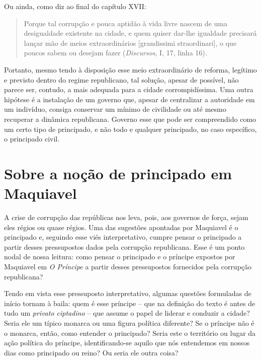 Ou ainda, como diz ao final do capítulo XVII:

\begin{quote}
Porque tal corrupção e pouca aptidão à vida livre nascem de uma
desigualdade existente na cidade, e quem quiser dar-lhe igualdade
precisará lançar mão de meios extraordinários {[}grandissimi
straordinari{]}, o que poucos sabem ou desejam fazer (\emph{Discursos},
I, 17, linha 16)\emph{.}
\end{quote}

Portanto, mesmo tendo à disposição esse meio extraordinário de reforma,
legítimo e previsto dentro do regime republicano, tal solução, apesar de
possível, não parece ser, contudo, a mais adequada para a cidade
corrompidíssima. Uma outra hipótese é a instalação de um governo que,
apesar de centralizar a autoridade em um indivíduo, consiga conservar um
mínimo de civilidade ou até mesmo recuperar a dinâmica republicana.
Governo esse que pode ser compreendido como um certo tipo de principado,
e não todo e qualquer principado, no caso específico, o principado
civil.

\section{Sobre a noção de principado em Maquiavel}

A crise de corrupção das repúblicas nos leva, pois, aos governos de
força, sejam eles régios ou quase régios. Uma das sugestões apontadas
por Maquiavel é o principado e, seguindo esse viés interpretativo,
cumpre pensar o principado a partir desses pressupostos dados pela
corrupção republicana. Esse é um ponto nodal de nossa leitura: como
pensar o principado e o príncipe expostos por Maquiavel em \emph{O
Príncipe} a partir desses pressupostos fornecidos pela corrupção
republicana?

Tendo em vista esse pressuposto interpretativo, algumas questões
formuladas de início tornam à baila: quem é esse príncipe -- que na
definição do texto é antes de tudo um \emph{privato ciptadino} -- que
assume o papel de liderar e conduzir a cidade? Seria ele um típico
monarca ou uma figura política diferente? Se o príncipe não é o monarca,
então, como entender o principado? Seria este o território ou lugar da
ação política do príncipe, identificando-se aquilo que nós entendemos em
nossos dias como principado ou reino? Ou seria ele outra coisa?

